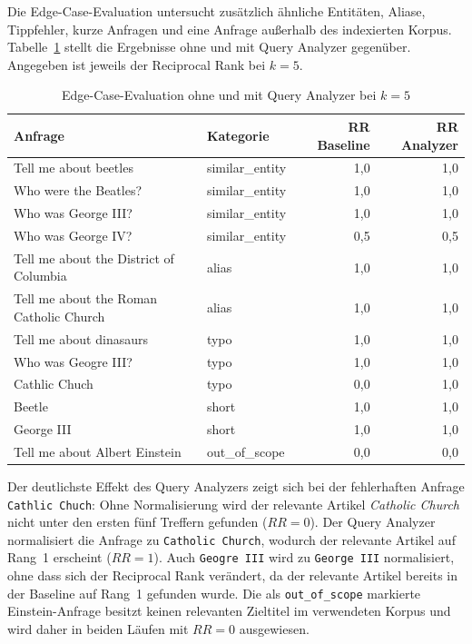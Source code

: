 Die Edge-Case-Evaluation untersucht zusätzlich ähnliche Entitäten, Aliase,
Tippfehler, kurze Anfragen und eine Anfrage außerhalb des indexierten Korpus.
Tabelle~\ref{tab:eval-edge-cases} stellt die Ergebnisse ohne und mit Query
Analyzer gegenüber. Angegeben ist jeweils der Reciprocal Rank bei $k=5$.

\begin{table}[ht]
\centering
\small
\caption{Edge-Case-Evaluation ohne und mit Query Analyzer bei $k=5$}
\label{tab:eval-edge-cases}
\begin{tabular}{p{5.8cm}lrr}
\toprule
Anfrage & Kategorie & RR Baseline & RR Analyzer \\
\midrule
Tell me about beetles & similar\_entity & 1,0 & 1,0 \\
Who were the Beatles? & similar\_entity & 1,0 & 1,0 \\
Who was George III? & similar\_entity & 1,0 & 1,0 \\
Who was George IV? & similar\_entity & 0,5 & 0,5 \\
Tell me about the District of Columbia & alias & 1,0 & 1,0 \\
Tell me about the Roman Catholic Church & alias & 1,0 & 1,0 \\
Tell me about dinasaurs & typo & 1,0 & 1,0 \\
Who was Geogre III? & typo & 1,0 & 1,0 \\
Cathlic Chuch & typo & 0,0 & 1,0 \\
Beetle & short & 1,0 & 1,0 \\
George III & short & 1,0 & 1,0 \\
Tell me about Albert Einstein & out\_of\_scope & 0,0 & 0,0 \\
\bottomrule
\end{tabular}
\end{table}

Der deutlichste Effekt des Query Analyzers zeigt sich bei der fehlerhaften
Anfrage \texttt{Cathlic Chuch}: Ohne Normalisierung wird der relevante Artikel
\textit{Catholic Church} nicht unter den ersten fünf Treffern gefunden
($RR=0$). Der Query Analyzer normalisiert die Anfrage zu
\texttt{Catholic Church}, wodurch der relevante Artikel auf Rang~1 erscheint
($RR=1$). Auch \texttt{Geogre III} wird zu \texttt{George III} normalisiert,
ohne dass sich der Reciprocal Rank verändert, da der relevante Artikel bereits
in der Baseline auf Rang~1 gefunden wurde. Die als \texttt{out\_of\_scope}
markierte Einstein-Anfrage besitzt keinen relevanten Zieltitel im verwendeten
Korpus und wird daher in beiden Läufen mit $RR=0$ ausgewiesen.

